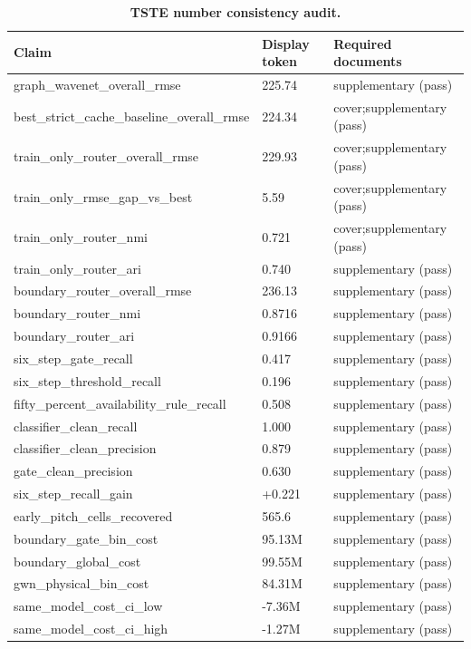 \begin{table}[H]
\centering
\scriptsize
\setlength{\tabcolsep}{3pt}
\renewcommand{\arraystretch}{1.05}
\caption*{\textbf{TSTE number consistency audit.}}
\begin{tabular}{lll}
\toprule
Claim & Display token & Required documents \\
\midrule
graph\_wavenet\_overall\_rmse & 225.74 & supplementary (pass) \\
best\_strict\_cache\_baseline\_overall\_rmse & 224.34 & cover;supplementary (pass) \\
train\_only\_router\_overall\_rmse & 229.93 & cover;supplementary (pass) \\
train\_only\_rmse\_gap\_vs\_best & 5.59 & cover;supplementary (pass) \\
train\_only\_router\_nmi & 0.721 & cover;supplementary (pass) \\
train\_only\_router\_ari & 0.740 & supplementary (pass) \\
boundary\_router\_overall\_rmse & 236.13 & supplementary (pass) \\
boundary\_router\_nmi & 0.8716 & supplementary (pass) \\
boundary\_router\_ari & 0.9166 & supplementary (pass) \\
six\_step\_gate\_recall & 0.417 & supplementary (pass) \\
six\_step\_threshold\_recall & 0.196 & supplementary (pass) \\
fifty\_percent\_availability\_rule\_recall & 0.508 & supplementary (pass) \\
classifier\_clean\_recall & 1.000 & supplementary (pass) \\
classifier\_clean\_precision & 0.879 & supplementary (pass) \\
gate\_clean\_precision & 0.630 & supplementary (pass) \\
six\_step\_recall\_gain & +0.221 & supplementary (pass) \\
early\_pitch\_cells\_recovered & 565.6 & supplementary (pass) \\
boundary\_gate\_bin\_cost & 95.13M & supplementary (pass) \\
boundary\_global\_cost & 99.55M & supplementary (pass) \\
gwn\_physical\_bin\_cost & 84.31M & supplementary (pass) \\
same\_model\_cost\_ci\_low & -7.36M & supplementary (pass) \\
same\_model\_cost\_ci\_high & -1.27M & supplementary (pass) \\

\end{tabular}
\end{table}

